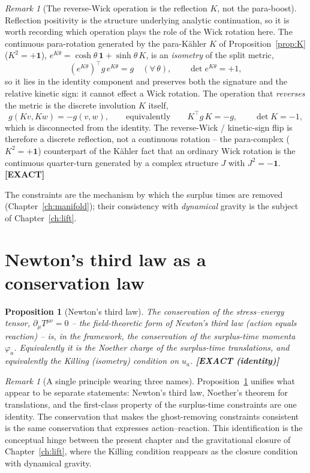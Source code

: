 \documentclass[11pt,oneside]{book}
\newcommand{\status}[1]{{\sffamily\bfseries\color{statuscol}[#1]}}
\theoremstyle{plain}
\newtheorem{proposition}[theorem]{Proposition}
\theoremstyle{definition}
\theoremstyle{remark}
\newtheorem{remark}[theorem]{Remark}
\begin{document}
\begin{remark}[The reverse-Wick operation is the reflection $K$, not the para-boost]
\label{rem:reverse-wick}
Reflection positivity is the structure underlying analytic continuation, so it is
worth recording which operation plays the role of the Wick rotation here. The
continuous para-rotation generated by the para-K\"ahler $K$ of
Proposition~\ref{prop:K} ($K^2=+\mathbf 1$),
$e^{K\theta}=\cosh\theta\,\mathbf 1+\sinh\theta\,K$, is an \emph{isometry} of the
split metric,
\[
  (e^{K\theta})^{\!\top} g\,e^{K\theta}=g\quad(\forall\,\theta),
  \qquad \det e^{K\theta}=+1,
\]
so it lies in the identity component and preserves both the signature and the
relative kinetic sign: it cannot effect a Wick rotation. The operation that
\emph{reverses} the metric is the discrete involution $K$ itself,
\[
  g(Kv,Kw)=-g(v,w),\qquad\text{equivalently}\qquad K^{\!\top} g\,K=-g,
  \qquad \det K=-1,
\]
which is disconnected from the identity. The reverse-Wick / kinetic-sign flip is
therefore a discrete reflection, not a continuous rotation -- the para-complex
($K^2=+\mathbf 1$) counterpart of the K\"ahler fact that an ordinary Wick rotation is
the continuous quarter-turn generated by a complex structure $J$ with
$J^2=-\mathbf 1$. \status{EXACT}
\end{remark}

The constraints are the mechanism by which the surplus times are removed
(Chapter~\ref{ch:manifold}); their consistency with \emph{dynamical} gravity is the
subject of Chapter~\ref{ch:lift}.

\section{Newton's third law as a conservation law}
\label{sec:newton}

\begin{proposition}[Newton's third law]
\label{prop:newton}
The conservation of the stress--energy tensor, $\partial_\mu T^{\mu\nu}=0$ -- the
field-theoretic form of Newton's third law (action equals reaction) -- is, in the
framework, the conservation of the surplus-time momenta $\varphi_a$. Equivalently it
is the Noether charge of the surplus-time translations, and equivalently the Killing
(isometry) condition on $u_a$. \status{EXACT (identity)}
\end{proposition}

\begin{remark}[A single principle wearing three names]
Proposition~\ref{prop:newton} unifies what appear to be separate statements:
Newton's third law, Noether's theorem for translations, and the first-class
property of the surplus-time constraints are one identity. The conservation that
makes the ghost-removing constraints consistent is the same conservation that
expresses action--reaction. This identification is the conceptual hinge between the
present chapter and the gravitational closure of Chapter~\ref{ch:lift}, where the
Killing condition reappears as the closure condition with dynamical gravity.
\end{remark}
\end{document}
